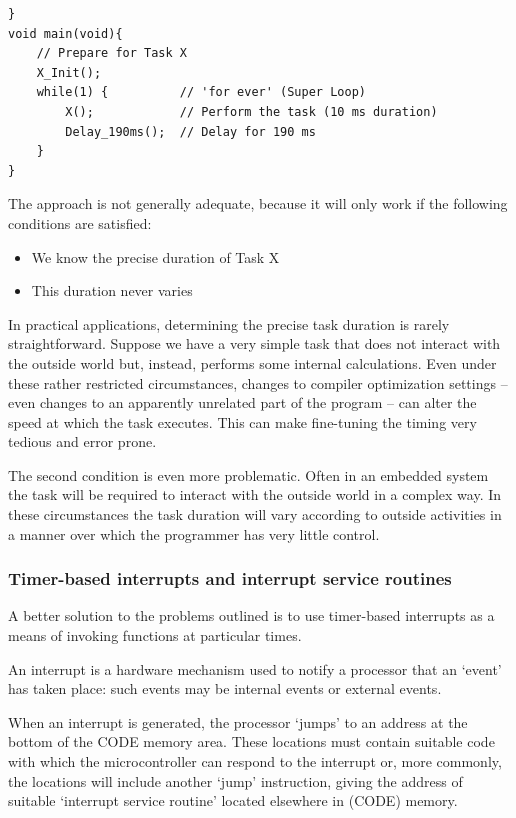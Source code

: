 \begin{lstlisting}[basicstyle=\small, caption= Trying to use the Super Loop architecture to execute tasks at regular intervals, label = {program_super_loop}]
}
void main(void){
    // Prepare for Task X
    X_Init();
    while(1) {          // 'for ever' (Super Loop)
        X();            // Perform the task (10 ms duration)
        Delay_190ms();  // Delay for 190 ms
    } 
}
\end{lstlisting}

The approach is not generally adequate, because it will only work if the following conditions are satisfied:
\begin{itemize}
    \item We know the precise duration of Task X
    \item This duration never varies
\end{itemize}

In practical applications, determining the precise task duration is rarely straightforward. Suppose we have a very simple task that does not interact with the outside
world but, instead, performs some internal calculations. Even under these rather
restricted circumstances, changes to compiler optimization settings – even changes to
an apparently unrelated part of the program – can alter the speed at which the task
executes. This can make fine-tuning the timing very tedious and error prone.

The second condition is even more problematic. Often in an embedded system the
task will be required to interact with the outside world in a complex way. In these circumstances the task duration will vary according to outside activities in a manner
over which the programmer has very little control.


\subsubsection{Timer-based interrupts and interrupt service routines}
A better solution to the problems outlined is to use timer-based interrupts as a means
of invoking functions at particular times.

An interrupt is a hardware mechanism used to notify a processor that an ‘event’ has taken place: such events may be internal events or external events.


When an interrupt is generated, the processor ‘jumps’ to an address at the bottom
of the CODE memory area. These locations must contain suitable code with which
the microcontroller can respond to the interrupt or, more commonly, the locations
will include another ‘jump’ instruction, giving the address of suitable ‘interrupt service routine’ located elsewhere in (CODE) memory.

